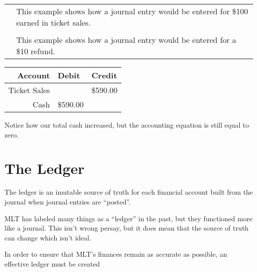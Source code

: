 \begin{tabular}{C{.5\linewidth}|L{.5\linewidth}}
     & This example shows how a journal entry would be entered for \$100 earned in ticket sales.\\
    &\\
     & This example shows how a journal entry would be entered for a \$10 refund.
\end{tabular}

\begin{center}
    \begin{tabular}{r|ll}
        Account & Debit & Credit\\
        \hline
        Ticket Sales & & \$590.00\\
        Cash & \$590.00 & \\
    \end{tabular}
\end{center}

Notice how our total cash increased, but the accounting equation is still equal to zero.


\section{The Ledger}

The ledger is an imutable source of truth for each financial account built from the journal when journal entries are ``posted''.

MLT has labeled many things as a ``ledger'' in the past, but they functioned more like a journal. This isn't wrong persay, but it does mean that the source of truth can change which isn't ideal.

In order to ensure that MLT's finances remain as accurate as possible, an effective ledger must be created

